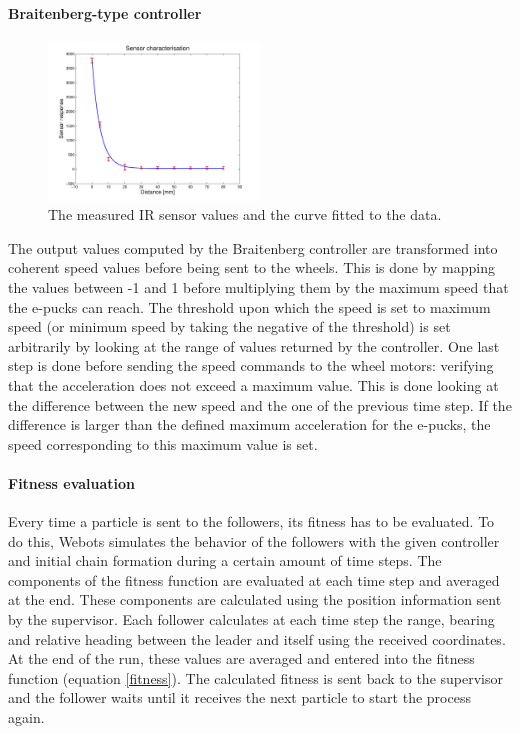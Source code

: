 \documentclass[a4paper, 10pt, conference]{ieeeconf}      %
\begin{document}
\paragraph{Braitenberg-type controller}

\begin{figure}[thpb]
      \centering
      \includegraphics[width = 0.5\textwidth]{images/sensor.pdf}
      \caption{The measured IR sensor values and the curve fitted to the data.}
      \label{fig:regression}
\end{figure}

The output values computed by the Braitenberg controller are transformed into coherent speed values before being sent to the wheels. This is done by mapping the values between -1 and 1 before multiplying them by the maximum speed that the e-pucks can reach. The threshold upon which the speed is set to maximum speed (or minimum speed by taking the negative of the threshold) is set arbitrarily by looking at the range of values returned by the controller.
One last step is done before sending the speed commands to the wheel motors: verifying that the acceleration does not exceed a maximum value. This is done looking at the difference between the new speed and the one of the previous time step. If the difference is larger than the defined maximum acceleration for the e-pucks, the speed corresponding to this maximum value is set.

\paragraph{Fitness evaluation}
Every time a particle is sent to the followers, its fitness has to be evaluated. To do this, Webots simulates the behavior of the followers with the given controller and initial chain formation during a certain amount of time steps. The components of the fitness function are evaluated at each time step and averaged at the end. These components are calculated using the position information sent by the supervisor. Each follower calculates at each time step the range, bearing and relative heading between the leader and itself using the received coordinates. At the end of the run, these values are averaged and entered into the fitness function (equation \ref{fitness}). The calculated fitness is sent back to the supervisor and the follower waits until it receives the next particle to start the process again.
\end{document}

